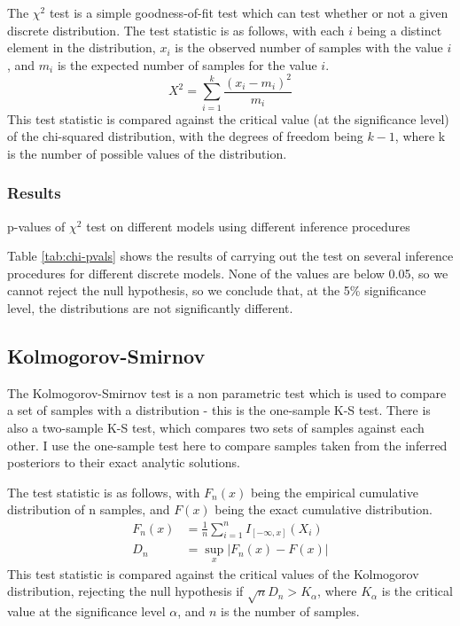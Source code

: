 The $\chi^2$ test is a simple goodness-of-fit test which can test whether or not a given discrete distribution. The test statistic is as follows, with each $i$ being a distinct element in the distribution, $x_i$ is the observed number of samples with the value $i$, and $m_i$ is the expected number of samples for the value $i$.
% 
\[X^{2}=\sum _{i=1}^{k}{\frac {(x_{i}-m_{i})^{2}}{m_{i}}}\]
% 
This test statistic is compared against the critical value (at the significance level) of the chi-squared distribution, with the degrees of freedom being $k-1$, where k is the number of possible values of the distribution.
\subsubsection{Results}
\begin{table}[!ht]
	\centering
	\caption{p-values of $\chi^2$ test on different models using different inference procedures}
	\label{tab:chi-pvals}
\end{table}

Table \ref{tab:chi-pvals} shows the results of carrying out the test on several inference procedures for different discrete models. None of the values are below 0.05, so we cannot reject the null hypothesis, so we conclude that, at the 5\% significance level, the distributions are not significantly different.

\subsection{Kolmogorov-Smirnov}

The Kolmogorov-Smirnov test is a non parametric test which is used to compare a set of samples with a distribution - this is the one-sample K-S test. There is also a two-sample K-S test, which compares two sets of samples against each other. I use the one-sample test here to compare samples taken from the inferred posteriors to their exact analytic solutions.

The test statistic is as follows, with $F_n(x)$ being the empirical cumulative distribution of n samples, and $F(x)$ being the exact cumulative distribution.
\begin{align*}
	F_{n}(x) & =\frac{1}{n}\sum_{i=1}^{n}I_{[-\infty ,x]}(X_{i}) \\
	D_{n}    & =\sup_{x}|F_{n}(x)-F(x)|                          
\end{align*}
This test statistic is compared against the critical values of the Kolmogorov distribution, rejecting the null hypothesis if $\sqrt{n}D_n > K_\alpha$, where $K_\alpha$ is the critical value at the significance level $\alpha$, and $n$ is the number of samples.

